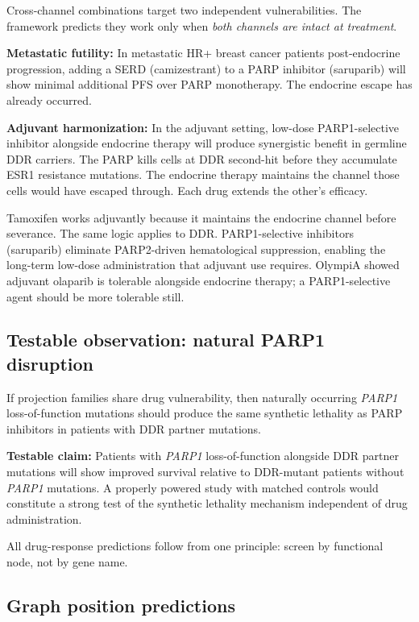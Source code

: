 \documentclass[11pt]{article}
\begin{document}
Cross-channel combinations target two independent vulnerabilities.
The framework predicts they work only when \emph{both channels are
intact at treatment}.

\textbf{Metastatic futility:} In metastatic HR+ breast cancer
patients post-endocrine progression, adding a SERD (camizestrant)
to a PARP inhibitor (saruparib) will show minimal additional PFS
over PARP monotherapy. The endocrine escape has already occurred.

\textbf{Adjuvant harmonization:} In the adjuvant setting, low-dose
PARP1-selective inhibitor alongside endocrine therapy will produce
synergistic benefit in germline DDR carriers. The PARP kills cells
at DDR second-hit before they accumulate ESR1 resistance mutations.
The endocrine therapy maintains the channel those cells would have
escaped through. Each drug extends the other's efficacy.

Tamoxifen works adjuvantly because it maintains the endocrine
channel before severance. The same logic applies to DDR. PARP1-selective
inhibitors (saruparib) eliminate PARP2-driven hematological
suppression, enabling the long-term low-dose administration that
adjuvant use requires. OlympiA showed adjuvant olaparib is
tolerable alongside endocrine therapy; a PARP1-selective agent
should be more tolerable still.

\subsection{Testable observation: natural PARP1 disruption}

If projection families share drug vulnerability, then naturally
occurring \emph{PARP1} loss-of-function mutations should produce
the same synthetic lethality as PARP inhibitors in patients with
DDR partner mutations.

\textbf{Testable claim:} Patients with \emph{PARP1}
loss-of-function alongside DDR partner mutations will show improved
survival relative to DDR-mutant patients without \emph{PARP1}
mutations. A properly powered study with matched controls would
constitute a strong test of the synthetic lethality mechanism
independent of drug administration.

All drug-response predictions follow from one principle: screen by
functional node, not by gene name.

\subsection{Graph position predictions}
\end{document}
